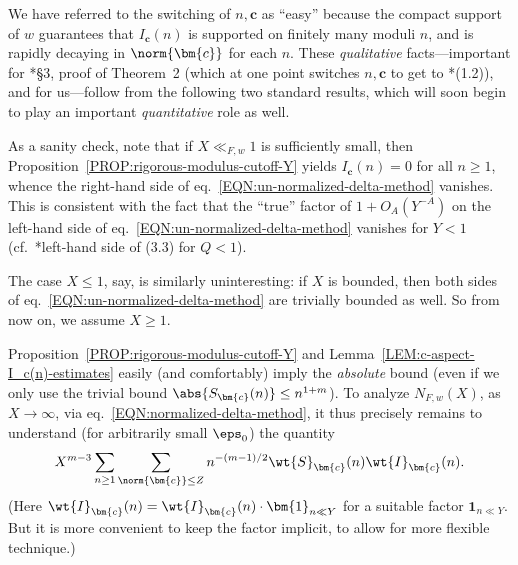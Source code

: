 \documentclass[12pt]{report}
\begin{document}
We have referred to the switching of $n,\bm{c}$ as ``easy''
because the compact support of $w$ guarantees that
$I_{\bm{c}}(n)$ is supported on finitely many moduli $n$,
and is rapidly decaying in $\norm{\bm{c}}$ for each $n$.
These \emph{qualitative} facts---important for \cite{heath1996new}*{\S3, proof of Theorem~2}
(which at one point switches $n,\bm{c}$ to get to \cite{heath1996new}*{(1.2)}),
and for us---follow from the following two standard results,
which will soon begin to play an important \emph{quantitative} role as well.



As a sanity check, note that if $X\ll_{F,w} 1$ is sufficiently small, then Proposition~\ref{PROP:rigorous-modulus-cutoff-Y} yields $I_{\bm{c}}(n)=0$ for all $n\geq 1$, whence the right-hand side of eq.~\eqref{EQN:un-normalized-delta-method} vanishes.
This is consistent with the fact that the ``true'' factor of $1+O_A(Y^{-A})$ on the left-hand side of eq.~\eqref{EQN:un-normalized-delta-method} vanishes for $Y<1$ (cf.~\cite{heath1996new}*{left-hand side of (3.3) for $Q<1$}).

The case $X\leq 1$, say, is similarly uninteresting: if $X$ is bounded, then both sides of eq.~\eqref{EQN:un-normalized-delta-method} are trivially bounded as well.
So from now on, we assume $X\geq 1$.



Proposition~\ref{PROP:rigorous-modulus-cutoff-Y} and Lemma~\ref{LEM:c-aspect-I_c(n)-estimates} easily (and comfortably) imply the \emph{absolute} bound
(even if we only use the trivial bound $\abs{S_{\bm{c}}(n)}\leq n^{1+m}$).
To analyze $N_{F,w}(X)$, as $X\to\infty$, via eq.~\eqref{EQN:normalized-delta-method},
it thus precisely remains to understand (for arbitrarily small $\eps_0$) the quantity
\begin{equation}
\label{EXPR:main-delta-method-quantity}
X^{m-3}\sum_{n\geq1}
\sum_{\norm{\bm{c}}\leq Z}n^{-(m-1)/2}\wt{S}_{\bm{c}}(n)\wt{I}_{\bm{c}}(n).
\end{equation}
(Here $\wt{I}_{\bm{c}}(n)
= \wt{I}_{\bm{c}}(n)\cdot\bm{1}_{n\ll Y}$
for a suitable factor $\bm{1}_{n\ll Y}$.
But it is more convenient to keep the factor implicit,
to allow for more flexible technique.)
\end{document}
